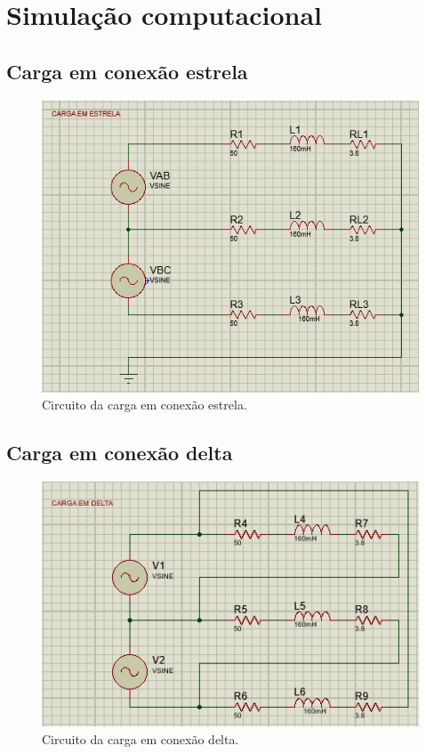 \documentclass[a4paper,12pt,oneside,openany,table,xcdraw]{article}
\begin{document}
\section{Simulação computacional} %
\subsection{Carga em conexão estrela}
\begin{figure}[H]
\centering
\captionsetup{font=scriptsize}
\includegraphics[width=14.5cm]{sim1}
\caption{Circuito da carga em conexão estrela.}
\label{sim1}
\end{figure}

\subsection{Carga em conexão delta}
\begin{figure}[H]
\centering
\captionsetup{font=scriptsize}
\includegraphics[width=14.5cm]{sim2}
\caption{Circuito da carga em conexão delta.}
\label{sim2}
\end{figure}
\end{document}
